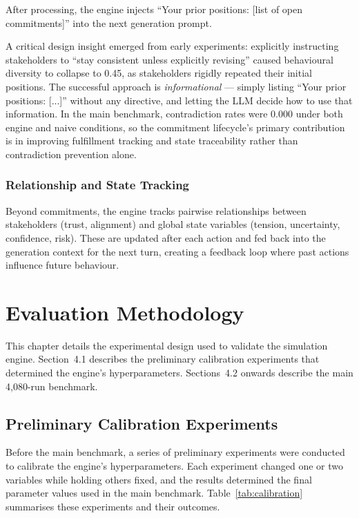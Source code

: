 \documentclass[12pt, a4paper]{report}
\begin{document}
After processing, the engine injects ``Your prior positions: [list of open commitments]'' into the next generation prompt.

A critical design insight emerged from early experiments: explicitly instructing stakeholders to ``stay consistent unless explicitly revising'' caused behavioural diversity to collapse to 0.45, as stakeholders rigidly repeated their initial positions. The successful approach is \textit{informational} --- simply listing ``Your prior positions: [...]'' without any directive, and letting the LLM decide how to use that information. In the main benchmark, contradiction rates were 0.000 under both engine and naive conditions, so the commitment lifecycle's primary contribution is in improving fulfillment tracking and state traceability rather than contradiction prevention alone.

\subsection{Relationship and State Tracking}

Beyond commitments, the engine tracks pairwise relationships between stakeholders (trust, alignment) and global state variables (tension, uncertainty, confidence, risk). These are updated after each action and fed back into the generation context for the next turn, creating a feedback loop where past actions influence future behaviour.


\chapter{Evaluation Methodology}

This chapter details the experimental design used to validate the simulation engine. Section~4.1 describes the preliminary calibration experiments that determined the engine's hyperparameters. Sections~4.2 onwards describe the main 4,080-run benchmark.


\section{Preliminary Calibration Experiments}

Before the main benchmark, a series of preliminary experiments were conducted to calibrate the engine's hyperparameters. Each experiment changed one or two variables while holding others fixed, and the results determined the final parameter values used in the main benchmark. Table~\ref{tab:calibration} summarises these experiments and their outcomes.
\end{document}
